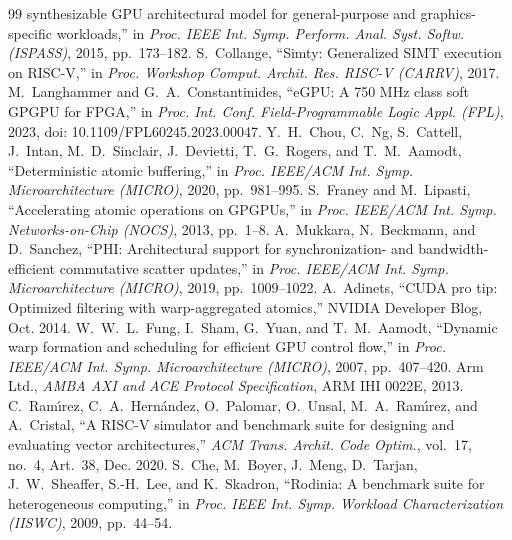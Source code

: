 \documentclass[journal]{IEEEtran}
\begin{document}
\begin{thebibliography}{99}
synthesizable GPU architectural model for general-purpose and graphics-specific
workloads,'' in \emph{Proc. IEEE Int. Symp. Perform. Anal. Syst. Softw.
(ISPASS)}, 2015, pp.~173--182.
 S.~Collange, ``Simty: Generalized SIMT execution on RISC-V,'' in
\emph{Proc. Workshop Comput. Archit. Res. RISC-V (CARRV)}, 2017.
 M.~Langhammer and G.~A.~Constantinides, ``eGPU: A 750 MHz class
soft GPGPU for FPGA,'' in \emph{Proc. Int. Conf. Field-Programmable Logic Appl.
(FPL)}, 2023, doi: 10.1109/FPL60245.2023.00047.
 Y.~H.~Chou, C.~Ng, S.~Cattell, J.~Intan, M.~D.~Sinclair,
J.~Devietti, T.~G.~Rogers, and T.~M.~Aamodt, ``Deterministic atomic buffering,''
in \emph{Proc. IEEE/ACM Int. Symp. Microarchitecture (MICRO)}, 2020,
pp.~981--995.
 S.~Franey and M.~Lipasti, ``Accelerating atomic operations on
GPGPUs,'' in \emph{Proc. IEEE/ACM Int. Symp. Networks-on-Chip (NOCS)}, 2013,
pp.~1--8.
 A.~Mukkara, N.~Beckmann, and D.~Sanchez, ``PHI: Architectural
support for synchronization- and bandwidth-efficient commutative scatter
updates,'' in \emph{Proc. IEEE/ACM Int. Symp. Microarchitecture (MICRO)}, 2019,
pp.~1009--1022.
 A.~Adinets, ``CUDA pro tip: Optimized filtering with
warp-aggregated atomics,'' NVIDIA Developer Blog, Oct. 2014.
 W.~W.~L.~Fung, I.~Sham, G.~Yuan, and T.~M.~Aamodt, ``Dynamic warp
formation and scheduling for efficient GPU control flow,'' in \emph{Proc. IEEE/ACM
Int. Symp. Microarchitecture (MICRO)}, 2007, pp.~407--420.
 Arm Ltd., \emph{AMBA AXI and ACE Protocol Specification}, ARM IHI
0022E, 2013.
 C.~Ram\'{\i}rez, C.~A.~Hern\'andez, O.~Palomar, O.~Unsal,
M.~A.~Ram\'{\i}rez, and A.~Cristal, ``A RISC-V simulator and benchmark suite for
designing and evaluating vector architectures,'' \emph{ACM Trans. Archit. Code
Optim.}, vol.~17, no.~4, Art.~38, Dec. 2020.
 S.~Che, M.~Boyer, J.~Meng, D.~Tarjan, J.~W.~Sheaffer, S.-H.~Lee,
and K.~Skadron, ``Rodinia: A benchmark suite for heterogeneous computing,'' in
\emph{Proc. IEEE Int. Symp. Workload Characterization (IISWC)}, 2009, pp.~44--54.
\end{thebibliography}

\end{document}

